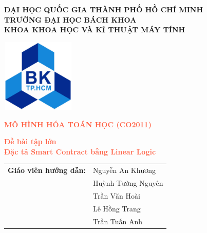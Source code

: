 \begin{titlepage}
	
	
\begin{center}  
{\small \textbf{ĐẠI HỌC QUỐC GIA THÀNH PHỐ HỒ CHÍ MINH\\ TRƯỜNG ĐẠI HỌC BÁCH KHOA\\KHOA KHOA HỌC VÀ KĨ THUẬT MÁY TÍNH\\}}

\vspace{1.8cm}

\includegraphics[width=3.5cm,height=3.5cm]{images/LogoBK}

\vspace{1.8cm}

{\large \textbf{\textcolor{tomato}{MÔ HÌNH HÓA TOÁN HỌC (CO2011)}}}

\vspace{0.5cm}

{\large \textbf{\textcolor{tomato}{ Đề bài tập lớn \\ \vspace{0.3cm} {\LARGE Đặc tả Smart Contract bằng Linear Logic} }}}  

\vspace{1.5cm}

\begin{table}[h!]
	\centering
	
	\begin{tabular}{ll}
		\multicolumn{1}{r}{\textbf{Giáo viên hướng dẫn:}} 
		& Nguyễn An Khương             \\
		& Huỳnh Tường Nguyên \\
		& Trần Văn Hoài \\
		& Lê Hồng Trang \\
		& Trần Tuấn Anh \\
		

\end{tabular}
\end{table}
\end{center}
\end{titlepage}
